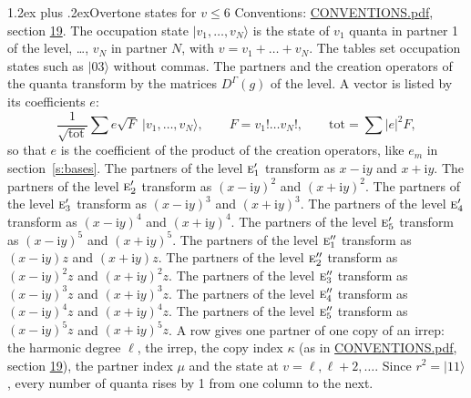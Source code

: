 \documentclass[10pt,a4paper]{article}
\makeatletter
\renewcommand\section{\@startsection{section}{1}{\z@}{-3ex plus -1ex minus -.2ex}%
  {1.2ex plus .2ex}{\normalfont\large\sffamily\bfseries\color{parttitle}}}
\numberwithin{equation}{section}
\newcommand{\irr}[1]{\text{\normalfont\scshape #1}}
\newcommand{\iunit}{\mathrm{i}}
\newcommand{\repD}[1]{D^{#1}}
\newcommand{\mult}{\kappa}
\newcommand{\intx}{\mu}
\newcommand{\occ}[1]{\lvert #1\rangle}
\makeatother
\begin{document}
\section{Overtone states for \texorpdfstring{$v \le 6$}{v \textleq\ 6}}\label{s:overtone_states}
Conventions: \href{../../CONVENTIONS.pdf}{CONVENTIONS.pdf}, section \href{../../CONVENTIONS.pdf\#conv.19}{19}.
\leavevmode\label{n:vector.occupation}\label{n:local.quanta.partner}\label{n:local.weight.occupation}The occupation state $\occ{v_1, \dots, v_N}$ is the state of $v_1$ quanta in partner 1 of the level, \dots, $v_N$ in partner $N$, with $v = v_1 + \dots + v_N$. The tables set occupation states such as $\occ{03}$ without commas. The partners and the creation operators of the quanta transform by the matrices $\repD{\Gamma}(g)$ of the level. A vector is listed by its coefficients $e$:
\begin{equation}\label{e:occupation}\frac{1}{\sqrt{\mathrm{tot}}}\sum e\sqrt{F}\;\occ{v_1, \dots, v_N},\qquad F = v_1!\dots v_N!,\qquad \mathrm{tot} = \sum |e|^2F,\end{equation}
so that $e$ is the coefficient of the product of the creation operators, like $e_m$ in section~\ref{s:bases}. The partners of the level $\irr{e}_{1}'$ transform as $x - \iunit y$ and $x + \iunit y$. The partners of the level $\irr{e}_{2}'$ transform as $(x - \iunit y)^{2}$ and $(x + \iunit y)^{2}$. The partners of the level $\irr{e}_{3}'$ transform as $(x - \iunit y)^{3}$ and $(x + \iunit y)^{3}$. The partners of the level $\irr{e}_{4}'$ transform as $(x - \iunit y)^{4}$ and $(x + \iunit y)^{4}$. The partners of the level $\irr{e}_{5}'$ transform as $(x - \iunit y)^{5}$ and $(x + \iunit y)^{5}$. The partners of the level $\irr{e}_{1}''$ transform as $(x - \iunit y) z$ and $(x + \iunit y) z$. The partners of the level $\irr{e}_{2}''$ transform as $(x - \iunit y)^{2} z$ and $(x + \iunit y)^{2} z$. The partners of the level $\irr{e}_{3}''$ transform as $(x - \iunit y)^{3} z$ and $(x + \iunit y)^{3} z$. The partners of the level $\irr{e}_{4}''$ transform as $(x - \iunit y)^{4} z$ and $(x + \iunit y)^{4} z$. The partners of the level $\irr{e}_{5}''$ transform as $(x - \iunit y)^{5} z$ and $(x + \iunit y)^{5} z$. A row gives one partner of one copy of an irrep: the harmonic degree $\ell$, the irrep, the copy index $\mult$ (as in \href{../../CONVENTIONS.pdf}{CONVENTIONS.pdf}, section \href{../../CONVENTIONS.pdf\#conv.19}{19}), the partner index $\intx$ and the state at $v = \ell, \ell + 2, \dots$. Since $r^2 = \occ{11}$, every number of quanta rises by 1 from one column to the next.
\end{document}
